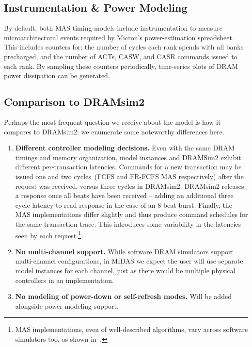 \subsection{Instrumentation \& Power Modeling}

By default, both MAS timing-models include instrumentation to measure
microarchitectural events required by Micron's power-estimation spreadsheet.
This includes counters for: the number of cycles each rank spends with all
banks precharged, and the number of ACTs, CASW, and CASR commands issued to
each rank. By sampling these counters periodically, time-series plots of DRAM
power dissipation can be generated.

\subsection{Comparison to DRAMsim2}

Perhaps the most frequent question we receive about the model is how it
compares to DRAMsim2: we enumerate some noteworthy differences here.

\begin{enumerate}
    \item \textbf{Different controller modeling decisions.} Even with the same
        DRAM timings and memory organization, model instances and
        DRAMSim2 exhibit different per-transaction latencies. Commands for a
        new transaction may be issued one and two cycles~(FCFS and FR-FCFS MAS
        respectively) after the request was received, versus three cycles in
        DRAMsim2. DRAMsim2 releases a response once all beats have been
        received -- adding an additional three cycle latency to read-response
        in the case of an 8 beat burst. Finally, the MAS implementations differ
        slightly and thus produce command schedules for the same transaction
        trace. This introduces some variability in the latencies seen by each
        request.\footnote{MAS implementations, even of well-described
        algorithms, vary across software simulators too, as shown
        in~\cite{ramulator}.}

    \item \textbf{No multi-channel support.} While software DRAM simulators
        support multi-channel configurations, in MIDAS we expect the user will
        use separate model instances for each channel, just as there would be
        multiple physical controllers in an implementation.

    \item \textbf{No modeling of power-down or self-refresh modes.} Will be
        added alongside power modeling support.

\end{enumerate}

